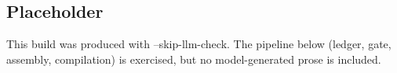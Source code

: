 \subsection*{Placeholder}
This build was produced with --skip-llm-check. The pipeline below (ledger, gate, assembly, compilation) is exercised, but no model-generated prose is included.
